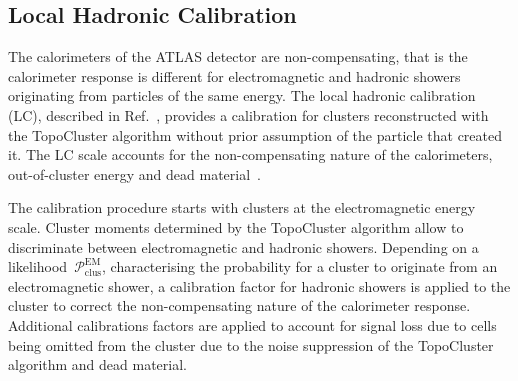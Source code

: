 \subsection{Local Hadronic Calibration}
\label{sec:local_hadronic_calib}

The calorimeters of the ATLAS detector are non-compensating, that is the
calorimeter response is different for electromagnetic and hadronic showers
originating from particles of the same energy. The local hadronic calibration
(LC), described in Ref.~\cite{atlas_topoclustering}, provides a calibration for
clusters reconstructed with the TopoCluster algorithm without prior assumption
of the particle that created it. The LC scale accounts for the non-compensating
nature of the calorimeters, out-of-cluster energy and dead
material~\cite{atlas_topoclustering}.

The calibration procedure starts with clusters at the electromagnetic energy
scale. Cluster moments determined by the TopoCluster algorithm allow to
discriminate between electromagnetic and hadronic showers. Depending on a
likelihood~$\mathcal{P}_\text{clus}^\text{EM}$, characterising the probability
for a cluster to originate from an electromagnetic shower, a calibration factor
for hadronic showers is applied to the cluster to correct the non-compensating
nature of the calorimeter response. Additional calibrations factors are applied
to account for signal loss due to cells being omitted from the cluster due to
the noise suppression of the TopoCluster algorithm and dead material.


